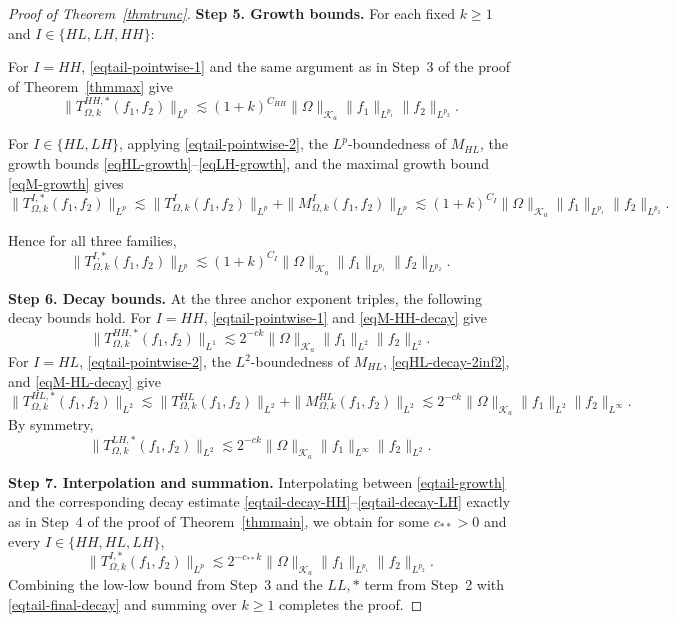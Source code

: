 \documentclass[11pt]{amsart}
\begin{document}
\begin{proof}[Proof of Theorem~\ref{thmtrunc}]
	\medskip
	\noindent
	\textbf{Step 5. Growth bounds.}
	For each fixed $k\ge 1$ and $I\in\{HL,LH,HH\}$:
	
	For $I=HH$, \eqref{eqtail-pointwise-1} and the same argument as
	in Step~3 of the proof of Theorem~\ref{thmmax} give
	\[
	\|T_{\Omega,k}^{HH,*}(f_1,f_2)\|_{L^p}
	\lesssim(1+k)^{C_{HH}}\|\Omega\|_{\mathcal K_a}
	\|f_1\|_{L^{p_1}}\|f_2\|_{L^{p_2}}.
	\]
	
	For $I\in\{HL,LH\}$, applying \eqref{eqtail-pointwise-2}, the
	$L^p$-boundedness of $M_{HL}$, the growth bounds
	\eqref{eqHL-growth}--\eqref{eqLH-growth}, and the maximal growth
	bound \eqref{eqM-growth} gives
	\[
	\|T_{\Omega,k}^{I,*}(f_1,f_2)\|_{L^p}
	\lesssim\|T_{\Omega,k}^I(f_1,f_2)\|_{L^p}
	+\|M_{\Omega,k}^I(f_1,f_2)\|_{L^p}
	\lesssim(1+k)^{C_I}\|\Omega\|_{\mathcal K_a}
	\|f_1\|_{L^{p_1}}\|f_2\|_{L^{p_2}}.
	\]
	
	Hence for all three families,
	\begin{equation}\label{eqtail-growth}
		\|T_{\Omega,k}^{I,*}(f_1,f_2)\|_{L^p}
		\lesssim(1+k)^{C_I}\|\Omega\|_{\mathcal K_a}
		\|f_1\|_{L^{p_1}}\|f_2\|_{L^{p_2}}.
	\end{equation}
	
	\medskip
	\noindent
	\textbf{Step 6. Decay bounds.}
	At the three anchor exponent triples, the following decay bounds hold.
	For $I=HH$, \eqref{eqtail-pointwise-1} and \eqref{eqM-HH-decay} give
	\begin{equation}\label{eqtail-decay-HH}
		\|T_{\Omega,k}^{HH,*}(f_1,f_2)\|_{L^1}
		\lesssim 2^{-ck}\|\Omega\|_{\mathcal K_a}
		\|f_1\|_{L^2}\|f_2\|_{L^2}.
	\end{equation}
	For $I=HL$, \eqref{eqtail-pointwise-2}, the $L^2$-boundedness of
	$M_{HL}$, \eqref{eqHL-decay-2inf2}, and \eqref{eqM-HL-decay} give
	\begin{equation}\label{eqtail-decay-HL}
		\|T_{\Omega,k}^{HL,*}(f_1,f_2)\|_{L^2}
		\lesssim\|T_{\Omega,k}^{HL}(f_1,f_2)\|_{L^2}
		+\|M_{\Omega,k}^{HL}(f_1,f_2)\|_{L^2}
		\lesssim 2^{-ck}\|\Omega\|_{\mathcal K_a}
		\|f_1\|_{L^2}\|f_2\|_{L^\infty}.
	\end{equation}
	By symmetry,
	\begin{equation}\label{eqtail-decay-LH}
		\|T_{\Omega,k}^{LH,*}(f_1,f_2)\|_{L^2}
		\lesssim 2^{-ck}\|\Omega\|_{\mathcal K_a}
		\|f_1\|_{L^\infty}\|f_2\|_{L^2}.
	\end{equation}
	
	\medskip
	\noindent
	\textbf{Step 7. Interpolation and summation.}
	Interpolating between \eqref{eqtail-growth} and the corresponding
	decay estimate \eqref{eqtail-decay-HH}--\eqref{eqtail-decay-LH}
	exactly as in Step~4 of the proof of Theorem~\ref{thmmain}, we obtain
	for some $c_{**}>0$ and every $I\in\{HH,HL,LH\}$,
	\begin{equation}\label{eqtail-final-decay}
		\|T_{\Omega,k}^{I,*}(f_1,f_2)\|_{L^p}
		\lesssim 2^{-c_{**}k}\|\Omega\|_{\mathcal K_a}
		\|f_1\|_{L^{p_1}}\|f_2\|_{L^{p_2}}.
	\end{equation}
	Combining the low-low bound from Step~3 and the $LL,*$ term from Step~2
	with \eqref{eqtail-final-decay} and summing over $k\ge 1$ completes the proof.
\end{proof}
\end{document}
